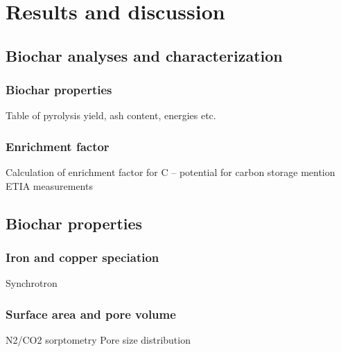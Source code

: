 \chapter{Results and discussion}\label{chap:Results&Disc}

\section{Biochar analyses and characterization}

\subsection{Biochar properties}
Table of pyrolysis yield, ash content, energies etc. 

\subsection{Enrichment factor}
Calculation of enrichment factor for C – potential for carbon storage
mention ETIA measurements

\section{Biochar properties}

\subsection{Iron and copper speciation}
Synchrotron

\subsection{Surface area and pore volume}
N2/CO2 sorptometry
Pore size distribution

